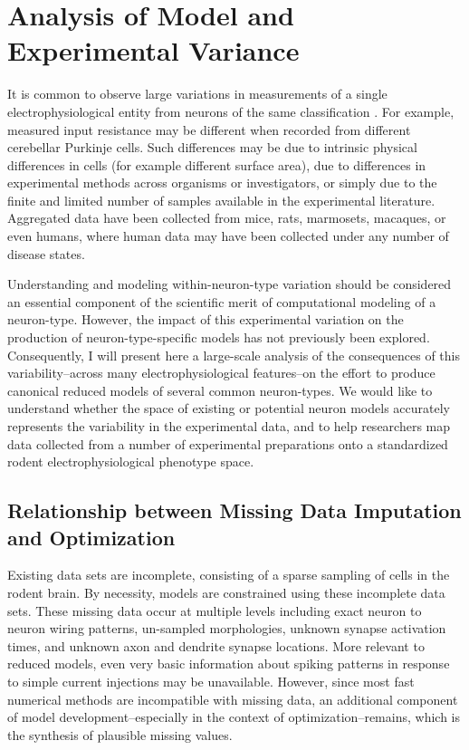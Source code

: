 \section{Analysis of Model and Experimental Variance}
It is common to observe large variations in measurements of a single electrophysiological entity from neurons of the same classification \citep{tripathy2014neuroelectro}.
For example, measured input resistance may be different when recorded from different cerebellar Purkinje cells.
Such differences may be due to intrinsic physical differences in cells (for example different surface area), due to differences in experimental methods across organisms or investigators, or simply due to the finite and limited number of samples available in the experimental literature.  
Aggregated data have been collected from mice, rats, marmosets, macaques, or even humans, where human data may have been collected under any number of disease states.

Understanding and modeling within-neuron-type variation should be considered an essential component of the scientific merit of computational modeling of a neuron-type.
However, the impact of this experimental variation on the production of neuron-type-specific models has not previously been explored.
Consequently, I will present here a large-scale analysis of the consequences of this variability--across many electrophysiological features--on the effort to produce canonical reduced models of several common neuron-types.
We would like to understand whether the space of existing or potential neuron models accurately represents the variability in the experimental data, and to help researchers map data collected from a number of experimental preparations onto a standardized rodent electrophysiological phenotype space.

\subsection{Relationship between Missing Data Imputation and Optimization}
Existing data sets are incomplete, consisting of a sparse sampling of cells in the rodent brain. By necessity, models are constrained using these incomplete data sets.
These missing data occur at multiple levels including exact neuron to neuron wiring patterns, un-sampled morphologies, unknown synapse activation times, and unknown axon and dendrite synapse locations.
More relevant to reduced models, even very basic information about spiking patterns in response to simple current injections may be unavailable.
However, since most fast numerical methods are incompatible with missing data, an additional component of model development--especially in the context of optimization--remains, which is the synthesis of plausible missing values.

